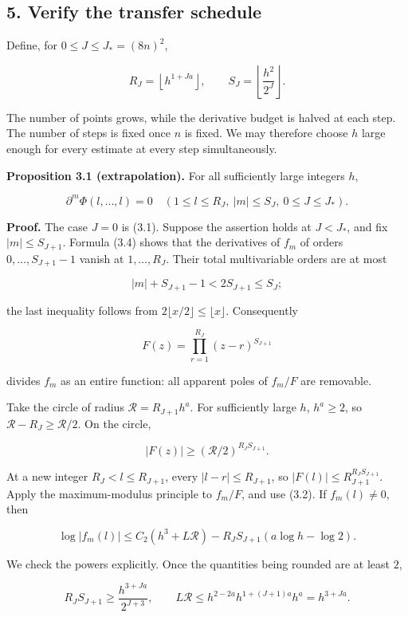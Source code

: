 \documentclass[
  11pt,
  a4paper,
]{article}
\begin{document}
\subsection{5. Verify the transfer
schedule}\label{verify-the-transfer-schedule}

Define, for \(0\le J\le J_*=(8n)^2\),

\[
R_J=\left\lfloor h^{1+Ja}\right\rfloor,\qquad
S_J=\left\lfloor\frac{h^2}{2^J}\right\rfloor.
\]

The number of points grows, while the derivative budget is halved at
each step. The number of steps is fixed once \(n\) is fixed. We may
therefore choose \(h\) large enough for every estimate at every step
simultaneously.

\textbf{Proposition 3.1 (extrapolation).} For all sufficiently large
integers \(h\),

\[
\partial^m\Phi(l,\ldots,l)=0
\quad(1\le l\le R_J,\ |m|\le S_J,\ 0\le J\le J_*). \tag{3.5}
\]

\textbf{Proof.} The case \(J=0\) is (3.1). Suppose the assertion holds
at \(J<J_*\), and fix \(|m|\le S_{J+1}\). Formula (3.4) shows that the
derivatives of \(f_m\) of orders \(0,\ldots,S_{J+1}-1\) vanish at
\(1,\ldots,R_J\). Their total multivariable orders are at most

\[
|m|+S_{J+1}-1<2S_{J+1}\le S_J;
\]

the last inequality follows from
\(2\lfloor x/2\rfloor\le\lfloor x\rfloor\). Consequently

\[
F(z)=\prod_{r=1}^{R_J}(z-r)^{S_{J+1}}
\]

divides \(f_m\) as an entire function: all apparent poles of \(f_m/F\)
are removable.

Take the circle of radius \(\mathcal R=R_{J+1}h^a\). For sufficiently
large \(h\), \(h^a\ge2\), so \(\mathcal R-R_J\ge\mathcal R/2\). On the
circle,

\[
|F(z)|\ge(\mathcal R/2)^{R_JS_{J+1}}.
\]

At a new integer \(R_J<l\le R_{J+1}\), every \(|l-r|\le R_{J+1}\), so
\(|F(l)|\le R_{J+1}^{R_JS_{J+1}}\). Apply the maximum-modulus principle
to \(f_m/F\), and use (3.2). If \(f_m(l)\ne0\), then

\[
\log|f_m(l)|\le C_2(h^3+L\mathcal R)
-R_JS_{J+1}(a\log h-\log2). \tag{3.6}
\]

We check the powers explicitly. Once the quantities being rounded are at
least \(2\),

\[
R_JS_{J+1}\ge\frac{h^{3+Ja}}{2^{J+3}},\qquad
L\mathcal R\le h^{2-2a}h^{1+(J+1)a}h^a=h^{3+Ja}.
\]
\end{document}
